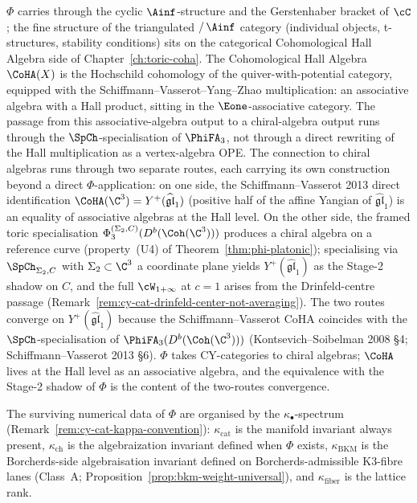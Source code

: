 \begin{remark}
\label{rem:phi-does-not-see}
$\Phi$ carries through the cyclic $\Ainf$-structure and the
Gerstenhaber bracket of $\cC$; the fine structure of the triangulated
$/\, \Ainf$ category (individual objects, t-structures, stability
conditions) sits on the categorical Cohomological Hall Algebra side
of Chapter~\textup{\ref{ch:toric-coha}}. The Cohomological Hall Algebra $\CoHA(X)$ is the Hochschild
cohomology of the quiver-with-potential category, equipped with the
Schiffmann--Vasserot--Yang--Zhao multiplication: an associative
algebra with a Hall product, sitting in the $\Eone$-associative
category. The passage from this associative-algebra output to a
chiral-algebra output runs through the
$\SpCh$-specialisation of $\PhiFA_3$, not through a direct rewriting
of the Hall multiplication as a vertex-algebra OPE. The connection to chiral algebras runs through two separate routes,
each carrying its own construction beyond a direct $\Phi$-application:
on one side, the Schiffmann--Vasserot 2013 direct identification
$\CoHA(\C^3) = Y^+(\widehat{\mathfrak{gl}}_1)$ (positive half of the
affine Yangian of $\widehat{\mathfrak{gl}}_1$) is an equality of
associative algebras at the Hall level. On the other side, the framed
toric specialisation $\Phi_3^{(\Sigma_2, C)}(D^b(\Coh(\C^3)))$
produces a chiral algebra on a reference curve (property~\textup{(U4)}
of Theorem~\textup{\ref{thm:phi-platonic}}); specialising via
$\SpCh_{\Sigma_2, C}$ with $\Sigma_2 \subset \C^3$ a coordinate plane
yields $Y^+(\widehat{\mathfrak{gl}}_1)$ as the Stage-2 shadow on $C$,
and the full $\cW_{1+\infty}$ at $c = 1$ arises from the
Drinfeld-centre passage
(Remark~\textup{\ref{rem:cy-cat-drinfeld-center-not-averaging}}).
The two routes converge on $Y^+(\widehat{\mathfrak{gl}}_1)$ because
the Schiffmann--Vasserot CoHA coincides with the $\SpCh$-specialisation
of $\PhiFA_3(D^b(\Coh(\C^3)))$ (Kontsevich--Soibelman 2008 \S 4;
Schiffmann--Vasserot 2013 \S 6). $\Phi$ takes CY-categories to
chiral algebras; $\CoHA$ lives at the Hall level as an associative
algebra, and the equivalence with the Stage-2 shadow of $\Phi$ is the
content of the two-routes convergence.

The surviving numerical data of $\Phi$ are organised by the $\kappa_\bullet$-spectrum (Remark~\textup{\ref{rem:cy-cat-kappa-convention}}): $\kappa_{\mathrm{cat}}$ is the manifold invariant always present, $\kappa_{\mathrm{ch}}$ is the algebraization invariant defined when $\Phi$ exists, $\kappa_{\mathrm{BKM}}$ is the Borcherds-side algebraisation invariant defined on Borcherds-admissible K3-fibre lanes (Class~A; Proposition~\textup{\ref{prop:bkm-weight-universal}}), and $\kappa_{\mathrm{fiber}}$ is the lattice rank.
\end{remark}

